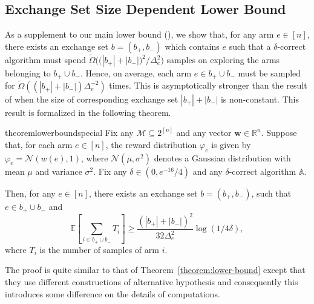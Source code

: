 \documentclass{article}
\newcommand{\Rew}{\varphi}
\newcommand{\E}{\mathbb E}
\newcommand{\M}{\mathcal M}
\newcommand{\RR}{\mathbb R}
\newcommand{\Bopt}{\mathcal B_{\mathsf{opt}}}
\renewcommand{\vec}[1]{\boldsymbol{#1}}
\begin{document}
\subsection{Exchange Set Size Dependent Lower Bound}
\label{section:lowerbound-evidence}
As a supplement to our main lower bound (), we show that, for any arm $e\in [n]$, there exists an exchange set $b=(b_+,b_-)$ which contains $e$ such that a $\delta$-correct algorithm must spend
$\tilde \Omega\Big(\big(|b_+|+|b_-|\big)^2 / \Delta_e^2 \Big)$ samples on exploring the arms belonging to $b_+\cup b_-$.
Hence, on average, each arm $e\in b_+ \cup b_-$ must be sampled for $\tilde \Omega( (|b_+|+|b_-|) \Delta_e^{-2})$ times.
This is asymptotically stronger than the result of  when the size of corresponding exchange set $|b_+|+|b_-|$ is non-constant.
This result is formalized in the following theorem.

\begin{restatable}{theorem}{lowerboundspecial}
\label{theorem:lowerboundspecial}
Fix any $\M\subseteq 2^{[n]}$ and any vector $\vec w \in \RR^n$.
Suppose that, for each arm $e\in [n]$, the reward distribution $\Rew_e$ is given by $\Rew_e=\mathcal N(w(e),1)$, where $\mathcal N(\mu, \sigma^2)$ denotes a Gaussian distribution with mean $\mu$ and variance $\sigma^2$. 
Fix any $\delta \in (0,e^{-16}/4)$
and any $\delta$-correct algorithm $\mathbb A$.

Then, for any $e\in [n]$, there exists an exchange set $b=(b_+,b_-)$, such that $e\in b_+ \cup b_-$ and
$$
\E\left[\sum_{i\in b_+\cup b_-} T_i\right] \ge \frac{(|b_+|+|b_-|)^2}{32\Delta_e^2}\log(1/4\delta),
$$
where $T_i$ is the number of samples of arm $i$.
\end{restatable}
The proof is quite similar to that of Theorem~\ref{theorem:lower-bound} except that they use different constructions of alternative hypothesis and consequently this introduces some difference on the details of computations.
\end{document}
